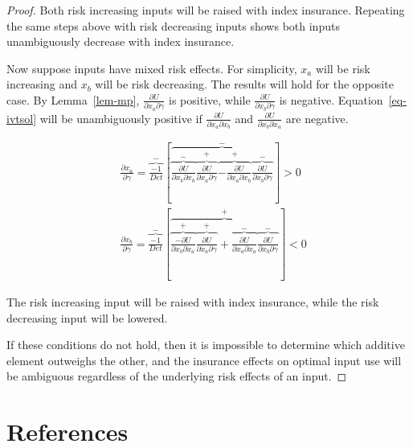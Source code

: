 \documentclass[
  letterpaper,
  DIV=11,
  numbers=noendperiod]{scrartcl}
\theoremstyle{plain}
\theoremstyle{plain}
\theoremstyle{remark}
\begin{document}
\begin{proof}
Both risk increasing inputs will be raised with index insurance.
Repeating the same steps above with risk decreasing inputs shows both
inputs unambiguously decrease with index insurance.

Now suppose inputs have mixed risk effects. For simplicity, \(x_a\) will
be risk increasing and \(x_b\) will be risk decreasing. The results will
hold for the opposite case. By Lemma~\ref{lem-mp},
\(\frac{\partial U}{\partial x_a\partial \gamma}\) is positive, while
\(\frac{\partial U}{\partial x_b\partial \gamma}\) is negative.
Equation~\ref{eq-ivtsol} will be unambiguously positive if
\(\frac{\partial U}{\partial x_a\partial x_b}\) and
\(\frac{\partial U}{\partial x_b\partial x_a}\) are negative.

\[
\begin{aligned}
&\frac{\partial x_a}{\partial \gamma}=\overbrace{\frac{-1}{Det}}^{-}\left[\overbrace{\overbrace{\frac{\partial U}{\partial x_b\partial x_b}}^{-}\overbrace{\frac{\partial U}{\partial x_a \partial \gamma}}^{+}\overbrace{-\frac{\partial U}{\partial x_a \partial x_b}}^{+}\overbrace{\frac{\partial U}{\partial x_b\partial \gamma}}^{-}}^{-}\right] >0\\
&\frac{\partial x_b}{\partial \gamma}=\overbrace{\frac{-1}{Det}}^{-}\left[\overbrace{\overbrace{\frac{-\partial U}{\partial x_b\partial x_a}}^{+}\overbrace{\frac{\partial U}{\partial x_a \partial \gamma}}^{+}+\overbrace{\frac{\partial U}{\partial x_a \partial x_a}}^{-}\overbrace{\frac{\partial U}{\partial x_b\partial \gamma}}^{-}}^{+}\right]<0
\end{aligned}
\]

The risk increasing input will be raised with index insurance, while the
risk decreasing input will be lowered.

If these conditions do not hold, then it is impossible to determine
which additive element outweighs the other, and the insurance effects on
optimal input use will be ambiguous regardless of the underlying risk
effects of an input.

\end{proof}

\hypertarget{references}{%
\section*{References}\label{references}}
\end{document}
